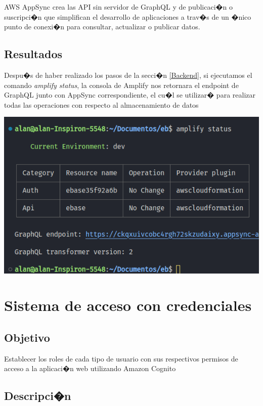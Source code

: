 \documentclass[12pt,letterpaper]{article}
\begin{document}
AWS AppSync crea las API sin servidor de GraphQL y de publicaci�n o suscripci�n que simplifican el desarrollo de aplicaciones a trav�s de un �nico punto de conexi�n para consultar, actualizar o publicar datos.

\subsection{Resultados}

Despu�s de haber realizado los pasos de la secci�n \ref{Backend}, si ejecutamos el comando \emph{amplify status}, la consola de Amplify nos retornara el endpoint de GraphQL junto con AppSync correspondiente, el cu�l se utilizar� para realizar todas las operaciones con respecto al almacenamiento de datos

\begin{center}
  \includegraphics[scale=0.55]{imagenes/appsyncendpoint}
 \label{fig:MongoA} 
\end{center} 


\newpage
\section{Sistema de acceso con credenciales}


\subsection{Objetivo}
Establecer los roles de cada tipo de usuario con sus respectivos permisos de acceso a la aplicaci�n web utilizando Amazon Cognito
\subsection{Descripci�n}
\end{document}
